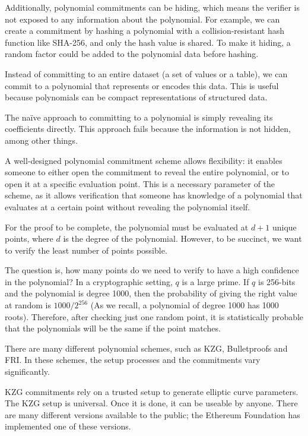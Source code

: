Additionally, polynomial commitments can be hiding, which means the verifier is not exposed to any information about the polynomial.
For example, we can create a commitment by hashing a polynomial with a collision-resistant hash function like SHA-256, and only the hash value is shared. 
To make it hiding, a random factor could be added to the polynomial data before hashing.

Instead of committing to an entire dataset (a set of values or a table), we can commit to a polynomial that represents or encodes this data. 
This is useful because polynomials can be compact representations of structured data.

The naïve approach to committing to a polynomial is simply revealing its coefficients directly.
This approach fails because the information is not hidden, among other things.

A well-designed polynomial commitment scheme allows flexibility: it enables someone to either open the commitment to reveal the entire polynomial,
or to open it at a specific evaluation point. 
This is a necessary parameter of the scheme, as it allows verification that someone has knowledge of a polynomial that evaluates at a certain point without revealing the polynomial itself.

For the proof to be complete, the polynomial must be evaluated at $d+1$ unique points, where $d$ is the degree of the polynomial.
However, to be succinct, we want to verify the least number of points possible.

The question is, how many points do we need to verify to have a high confidence in the polynomial?
In a cryptographic setting, $q$ is a large prime. If $q$ is 256-bits and the polynomial is degree 1000, 
then the probability of giving the right value at random is $1000/2^256$ (As we recall, a polynomial of degree 1000 has 1000 roots). 
Therefore, after checking just one random point, it is statistically probable that the polynomials will be the same if the point matches. \cite{VR23}

There are many different polynomial schemes, such as KZG, Bulletproofs and FRI. 
In these schemes, the setup processes and the commitments vary significantly. 

KZG commitments rely on a trusted setup to generate elliptic curve parameters\cite{KZG}. The KZG setup is universal. Once it is done, it can be useable by anyone. 
There are many different versions available to the public; the Ethereum Foundation has implemented one of these versions. 

